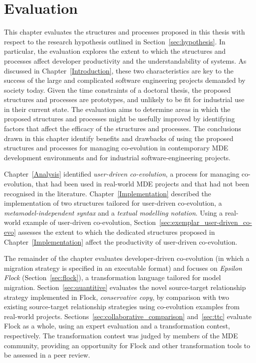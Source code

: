 
\chapter{Evaluation}
\label{Evaluation}
This chapter evaluates the structures and processes proposed in this thesis with respect to the research hypothesis outlined in Section~\ref{sec:hypothesis}. In particular, the evaluation explores the extent to which the structures and processes affect developer productivity and the understandability of systems. As discussed in Chapter~\ref{Introduction}, 
these two characteristics are key to the success of the large and complicated software engineering projects demanded by society today. Given the time constraints of a doctoral thesis, the proposed structures and processes are prototypes, and unlikely to be fit for industrial use in their current state. The evaluation aims to determine areas in which the proposed structures and processes might be usefully improved by identifying factors that affect the efficacy of the structures and processes. The conclusions drawn in this chapter identify benefits and drawbacks of using the proposed structures and processes for managing co-evolution in contemporary MDE development environments and for industrial software-engineering projects.

Chapter~\ref{Analysis} identified \emph{user-driven co-evolution}, a process for managing co-evolution, that had been used in real-world MDE projects and that had not been recognised in the literature. Chapter~\ref{Implementation} described the implementation of two structures tailored for user-driven co-evolution, a \emph{metamodel-independent syntax} and a \emph{textual modelling notation}. Using a real-world example of user-driven co-evolution, Section~\ref{sec:exemplar_user-driven_co-evo} assesses the extent to which the dedicated structures proposed in Chapter~\ref{Implementation} affect the productivity of user-driven co-evolution.

The remainder of the chapter evaluates developer-driven co-evolution (in which a migration strategy is specified in an executable format) and focuses on \emph{Epsilon Flock} (Section~\ref{sec:flock}), a transformation language tailored for model migration. Section~\ref{sec:quantitive} evaluates the novel source-target relationship strategy implemented in Flock, \emph{conservative copy}, by comparison with two existing source-target relationship strategies using co-evolution examples from real-world projects. Sections~\ref{sec:collaborative_comparison} and~\ref{sec:ttc} evaluate Flock as a whole, using an expert evaluation and a transformation contest, respectively. The transformation contest was judged by members of the MDE community, providing an opportunity for Flock and other transformation tools to be assessed in a peer review.

